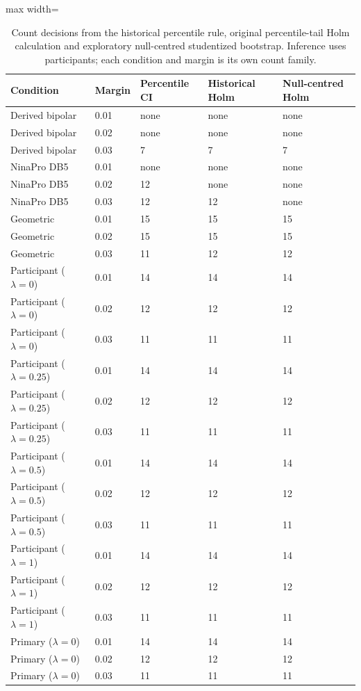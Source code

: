 \begin{table}[htbp]
\centering\small
\caption{Count decisions from the historical percentile rule, original percentile-tail Holm calculation and exploratory null-centred studentized bootstrap. Inference uses participants; each condition and margin is its own count family.}\label{tab:niaudit}
\begin{adjustbox}{max width=\textwidth}
\begin{tabular}{lllll}\toprule
Condition & Margin & Percentile CI & Historical Holm & Null-centred Holm\\\midrule
Derived bipolar & 0.01 & none & none & none\\
Derived bipolar & 0.02 & none & none & none\\
Derived bipolar & 0.03 & 7 & 7 & 7\\
NinaPro DB5 & 0.01 & none & none & none\\
NinaPro DB5 & 0.02 & 12 & none & none\\
NinaPro DB5 & 0.03 & 12 & 12 & none\\
Geometric & 0.01 & 15 & 15 & 15\\
Geometric & 0.02 & 15 & 15 & 15\\
Geometric & 0.03 & 11 & 12 & 12\\
Participant ($\lambda=0$) & 0.01 & 14 & 14 & 14\\
Participant ($\lambda=0$) & 0.02 & 12 & 12 & 12\\
Participant ($\lambda=0$) & 0.03 & 11 & 11 & 11\\
Participant ($\lambda=0.25$) & 0.01 & 14 & 14 & 14\\
Participant ($\lambda=0.25$) & 0.02 & 12 & 12 & 12\\
Participant ($\lambda=0.25$) & 0.03 & 11 & 11 & 11\\
Participant ($\lambda=0.5$) & 0.01 & 14 & 14 & 14\\
Participant ($\lambda=0.5$) & 0.02 & 12 & 12 & 12\\
Participant ($\lambda=0.5$) & 0.03 & 11 & 11 & 11\\
Participant ($\lambda=1$) & 0.01 & 14 & 14 & 14\\
Participant ($\lambda=1$) & 0.02 & 12 & 12 & 12\\
Participant ($\lambda=1$) & 0.03 & 11 & 11 & 11\\
Primary ($\lambda=0$) & 0.01 & 14 & 14 & 14\\
Primary ($\lambda=0$) & 0.02 & 12 & 12 & 12\\
Primary ($\lambda=0$) & 0.03 & 11 & 11 & 11\\

\end{tabular}
\end{adjustbox}
\end{table}
